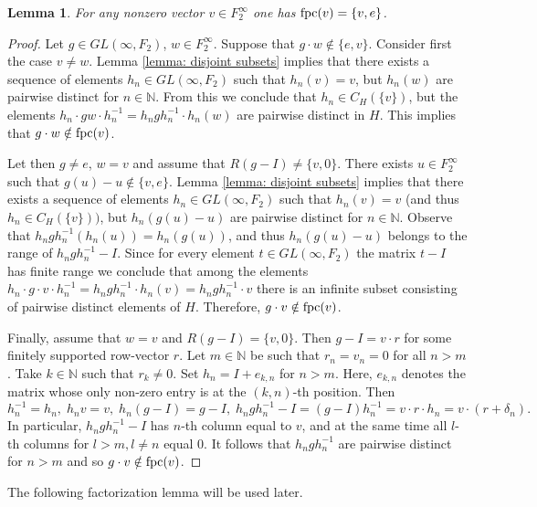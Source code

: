 \documentclass[11pt]{amsart}
\newcommand{\N}{\mathbb N}
\newcommand{\fpc}{{\rm fpc}}
\theoremstyle{plain}
\newtheorem{lemma}[theorem]{Lemma}
\theoremstyle{definition}
\theoremstyle{remark}
\numberwithin{equation}{section}
\begin{document}
\begin{lemma}\label{lem:fpc(v)}
	For any nonzero vector $v\in F_2^\infty$ one has $\fpc(v)=\{v,e\}$.
\end{lemma}
	\begin{proof} 
	Let $g\in GL(\infty,F_2)$, $w \in F_2^\infty$. Suppose that $g\cdot w\notin\{e,v\}$. Consider first the case %
	$v\neq w$. Lemma \ref{lemma: disjoint subsets} implies that there exists a sequence of elements $h_n\in GL(\infty,F_2)$ such that $h_n(v)=v$, but $h_n(w)$ are pairwise distinct for $n\in\mathbb N$. From this we conclude that $h_n\in C_H(\{v\})$, but  the elements $h_n\cdot gw\cdot h_n^{-1} = h_ngh_n^{-1}\cdot h_n(w)$  are pairwise distinct in $H$. This implies that $g \cdot w\notin\fpc(v)$.
	
	
	Let then $g\neq e$, $w=v$ and assume that $R(g-I)\neq\{v,0\}$. There exists $u\in F_2^\infty$ such that $g(u)-u\notin \{v,e\}$. Lemma \ref{lemma: disjoint subsets} implies that there exists a sequence of elements $h_n\in GL(\infty,F_2)$ such that $h_n(v)=v$ (and thus $h_n\in C_H(\{v\}))$, but $h_n(g(u)-u)$ are pairwise distinct for $n\in\mathbb N$. Observe that $h_ngh_n^{-1}(h_n(u))=h_n(g(u))$, and thus $h_n(g(u)-u)$ belongs to the range of $h_ngh_n^{-1}-I$. Since for every element $t\in GL(\infty,F_2)$ the matrix $t-I$ has finite range we conclude that  among the elements $h_n\cdot g\cdot v\cdot h_n^{-1}=h_n gh_n^{-1}\cdot h_n(v) = h_n gh_n^{-1}\cdot v $ there is an infinite subset consisting of pairwise distinct elements of $H$. Therefore, $g\cdot v\notin\fpc(v)$.
	
	Finally, assume that $w=v$ and $R(g-I)=\{v,0\}$. Then $g-I=v\cdot r$ for some finitely supported row-vector $r$. Let $m\in \N$ be such that $r_n=v_n=0$ for all $n>m$. Take $k\in \N$ such that $r_k\neq 0$. Set $h_n=I+e_{k,n}$ for $n>m$. Here, $e_{k,n}$ denotes the matrix whose only non-zero entry is at the $(k,n)$-th position. Then $$h_n^{-1}=h_n,\;h_nv=v,\;h_n(g-I)=g-I,\;h_ngh_n^{-1}-I=(g-I)h_n^{-1}=v\cdot r\cdot h_n=v\cdot (r+\delta_n).$$ In particular, $h_ngh_n^{-1}-I$ has $n$-th column equal to $v$, and at the same time all $l$-th columns for $l>m, l \neq n$ equal $0$. It follows that $h_ngh_n^{-1}$ are pairwise distinct for $n>m$ and so $g\cdot v\notin\fpc(v)$. 
\end{proof}

The following factorization lemma will be used later.
\end{document}
